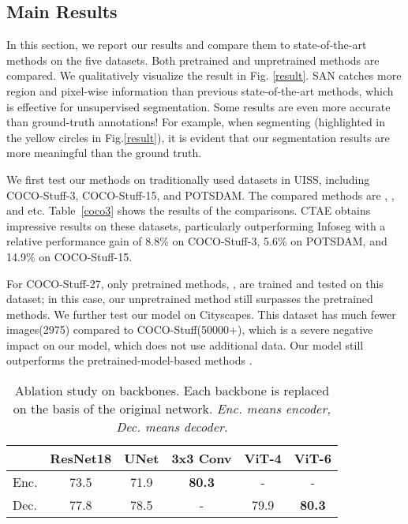 \documentclass[letterpaper]{article} \usepackage{aaai23}  \usepackage{times}  \usepackage{helvet}  \usepackage{courier}  \usepackage[hyphens]{url}  \usepackage{graphicx} \urlstyle{rm} \def\UrlFont{\rm}  \usepackage{natbib}  \usepackage{caption} \frenchspacing  \setlength{\pdfpagewidth}{8.5in}  \setlength{\pdfpageheight}{11in}  \usepackage{algorithm}
\begin{document}
\subsection{Main Results}

In this section, we report our results and compare them to state-of-the-art methods on the five datasets. Both pretrained and unpretrained methods are compared. We qualitatively visualize the result in Fig. \ref{result}. SAN catches more region and pixel-wise information than previous state-of-the-art methods, which is effective for unsupervised segmentation. Some results are even more accurate than ground-truth annotations! For example, when segmenting (highlighted in the yellow circles in Fig.\ref{result}), it is evident that our segmentation results are more meaningful than the ground truth.

We first test our methods on traditionally used datasets in UISS, including COCO-Stuff-3, COCO-Stuff-15, and POTSDAM. The compared methods are \cite{ji2019invariant}, \cite{ouali2020autoregressive}, \cite{mirsadeghi2021unsupervised} and \cite{wang2022fully} etc.  Table~\ref{coco3} shows the results of the comparisons. CTAE obtains impressive results on these datasets, particularly outperforming Infoseg\cite{harb2021infoseg} with a relative performance gain of 8.8\% on COCO-Stuff-3, 5.6\% on POTSDAM, and 14.9\%  on COCO-Stuff-15. 

For COCO-Stuff-27, only pretrained methods\cite{chen2020improved}, \cite{caron2021emerging}, \cite{cho2021picie} are trained and tested on this dataset; in this case, our unpretrained method still surpasses the pretrained methods. We further test our model on Cityscapes. This dataset has much fewer images(2975) compared to COCO-Stuff(50000+), which is a severe negative impact on our model, which does not use additional data. Our model still outperforms the pretrained-model-based methods\cite{ji2019invariant} .

\begin{table}[t]
    \centering
    \begin{tabular}{l|ccccc}
    \hline
     & ResNet18 & UNet & 3x3 Conv  & ViT-4& ViT-6\\
\hline
Enc. & 73.5 & 71.9  & \textbf{80.3}&- &-  \\
\hline
Dec.  & 77.8 & 78.5  & - & 79.9&\textbf{80.3}  \\

    \hline
    \end{tabular}
    \caption{Ablation study on backbones. Each backbone is replaced on the basis of the original network. \textit{Enc. means encoder, Dec. means decoder.}}
    \label{ab0}
\end{table}
\end{document}
